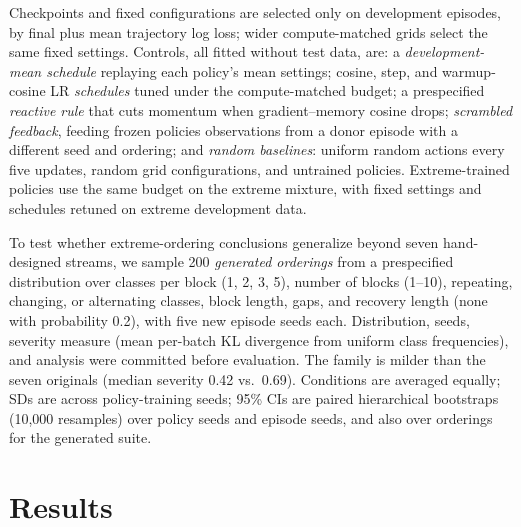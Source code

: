 \documentclass{article}
\begin{document}
Checkpoints and fixed configurations are selected only on development episodes, by final plus mean trajectory log loss; wider compute-matched grids select the same fixed settings. Controls, all fitted without test data, are: a \emph{development-mean schedule} replaying each policy's mean settings; cosine, step, and warmup-cosine LR \emph{schedules} tuned under the compute-matched budget; a prespecified \emph{reactive rule} that cuts momentum when gradient--memory cosine drops; \emph{scrambled feedback}, feeding frozen policies observations from a donor episode with a different seed and ordering; and \emph{random baselines}: uniform random actions every five updates, random grid configurations, and untrained policies. Extreme-trained policies use the same budget on the extreme mixture, with fixed settings and schedules retuned on extreme development data.

To test whether extreme-ordering conclusions generalize beyond seven hand-designed streams, we sample 200 \emph{generated orderings} from a prespecified distribution over classes per block (1, 2, 3, 5), number of blocks (1--10), repeating, changing, or alternating classes, block length, gaps, and recovery length (none with probability 0.2), with five new episode seeds each. Distribution, seeds, severity measure (mean per-batch KL divergence from uniform class frequencies), and analysis were committed before evaluation. The family is milder than the seven originals (median severity 0.42 vs.\ 0.69). Conditions are averaged equally; SDs are across policy-training seeds; 95\% CIs are paired hierarchical bootstraps (10,000 resamples) over policy seeds and episode seeds, and also over orderings for the generated suite.

\section{Results}
\end{document}
